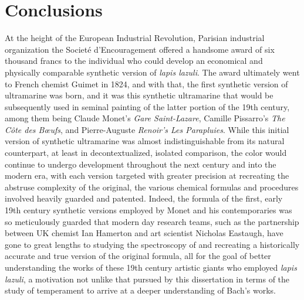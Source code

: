     
    
    
    

    \hypertarget{Conclusions}{\chapter{Conclusions}\label{Conclusions}}
    At the height of the European Industrial Revolution, Parisian industrial
organization the Societé d'Encouragement offered a handsome award of six
thousand francs to the individual who could develop an economical and
physically comparable synthetic version of \emph{lapis lazuli}. The
award ultimately went to French chemist Guimet in 1824, and with that,
the first synthetic version of ultramarine was born, and it was this
synthetic ultramarine that would be subsequently used in seminal
painting of the latter portion of the 19th century, among them being
Claude Monet's \emph{Gare Saint-Lazare}, Camille Pissarro's \emph{The
Côte des Bœufs}, and Pierre-Auguste \emph{Renoir's Les Parapluies}.
While this initial version of synthetic ultramarine was almost
indistinguishable from its natural counterpart, at least in
decontextualized, isolated comparison, the color would continue to
undergo development throughout the next century and into the modern era,
with each version targeted with greater precision at recreating the
abstruse complexity of the original, the various chemical formulas and
procedures involved heavily guarded and patented. Indeed, the formula of
the first, early 19th century synthetic versions employed by Monet and
his contemporaries was so meticulously guarded that modern day research
teams, such as the partnership between UK chemist Ian Hamerton and art
scientist Nicholas Eastaugh, have gone to great lengths to studying the
spectroscopy of and recreating a historically accurate and true version
of the original formula, all for the goal of better understanding the
works of these 19th century artistic giants who employed \emph{lapis
lazuli}, a motivation not unlike that pursued by this dissertation in
terms of the study of temperament to arrive at a deeper understanding of
Bach's works.

